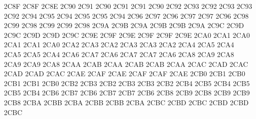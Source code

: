 \setcclcuc 2C8F 2C8F 2C8E %
\setcclcuc 2C90 2C91 2C90 %
\setcclcuc 2C91 2C91 2C90 %
\setcclcuc 2C92 2C93 2C92 %
\setcclcuc 2C93 2C93 2C92 %
\setcclcuc 2C94 2C95 2C94 %
\setcclcuc 2C95 2C95 2C94 %
\setcclcuc 2C96 2C97 2C96 %
\setcclcuc 2C97 2C97 2C96 %
\setcclcuc 2C98 2C99 2C98 %
\setcclcuc 2C99 2C99 2C98 %
\setcclcuc 2C9A 2C9B 2C9A %
\setcclcuc 2C9B 2C9B 2C9A %
\setcclcuc 2C9C 2C9D 2C9C %
\setcclcuc 2C9D 2C9D 2C9C %
\setcclcuc 2C9E 2C9F 2C9E %
\setcclcuc 2C9F 2C9F 2C9E %
\setcclcuc 2CA0 2CA1 2CA0 %
\setcclcuc 2CA1 2CA1 2CA0 %
\setcclcuc 2CA2 2CA3 2CA2 %
\setcclcuc 2CA3 2CA3 2CA2 %
\setcclcuc 2CA4 2CA5 2CA4 %
\setcclcuc 2CA5 2CA5 2CA4 %
\setcclcuc 2CA6 2CA7 2CA6 %
\setcclcuc 2CA7 2CA7 2CA6 %
\setcclcuc 2CA8 2CA9 2CA8 %
\setcclcuc 2CA9 2CA9 2CA8 %
\setcclcuc 2CAA 2CAB 2CAA %
\setcclcuc 2CAB 2CAB 2CAA %
\setcclcuc 2CAC 2CAD 2CAC %
\setcclcuc 2CAD 2CAD 2CAC %
\setcclcuc 2CAE 2CAF 2CAE %
\setcclcuc 2CAF 2CAF 2CAE %
\setcclcuc 2CB0 2CB1 2CB0 %
\setcclcuc 2CB1 2CB1 2CB0 %
\setcclcuc 2CB2 2CB3 2CB2 %
\setcclcuc 2CB3 2CB3 2CB2 %
\setcclcuc 2CB4 2CB5 2CB4 %
\setcclcuc 2CB5 2CB5 2CB4 %
\setcclcuc 2CB6 2CB7 2CB6 %
\setcclcuc 2CB7 2CB7 2CB6 %
\setcclcuc 2CB8 2CB9 2CB8 %
\setcclcuc 2CB9 2CB9 2CB8 %
\setcclcuc 2CBA 2CBB 2CBA %
\setcclcuc 2CBB 2CBB 2CBA %
\setcclcuc 2CBC 2CBD 2CBC %
\setcclcuc 2CBD 2CBD 2CBC %
